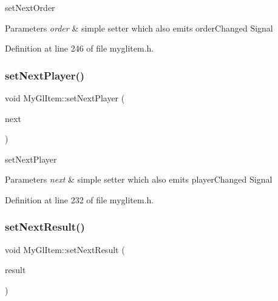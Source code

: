 set\+Next\+Order 


\begin{DoxyParams}{Parameters}
{\em order} & simple setter which also emits order\+Changed Signal \\
\hline
\end{DoxyParams}


Definition at line 246 of file myglitem.\+h.

\mbox{\label{class_my_gl_item_a17b24c5af31fe0fed3ca7253c59fd7ee}} 
\subsubsection{\texorpdfstring{setNextPlayer()}{setNextPlayer()}}
{\footnotesize\ttfamily void My\+Gl\+Item\+::set\+Next\+Player (\begin{DoxyParamCaption}\item[{Q\+String}]{next }\end{DoxyParamCaption})\hspace{0.3cm}{\ttfamily [inline]}}



set\+Next\+Player 


\begin{DoxyParams}{Parameters}
{\em next} & simple setter which also emits player\+Changed Signal \\
\hline
\end{DoxyParams}


Definition at line 232 of file myglitem.\+h.

\mbox{\label{class_my_gl_item_ae876b4b064add1a66a8a7dca732ac282}} 
\subsubsection{\texorpdfstring{setNextResult()}{setNextResult()}}
{\footnotesize\ttfamily void My\+Gl\+Item\+::set\+Next\+Result (\begin{DoxyParamCaption}\item[{Q\+List$<$ int $>$}]{result }\end{DoxyParamCaption})\hspace{0.3cm}{\ttfamily [inline]}}



